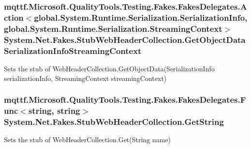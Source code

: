 \hypertarget{class_system_1_1_net_1_1_fakes_1_1_stub_web_header_collection_a063f0856dea1792cac0049c6c4a3ed7d}{
\subsubsection[{Get\-Object\-Data\-Serialization\-Info\-Streaming\-Context}]{\setlength{\rightskip}{0pt plus 5cm}mqttf.\-Microsoft.\-Quality\-Tools.\-Testing.\-Fakes.\-Fakes\-Delegates.\-Action$<$global.\-System.\-Runtime.\-Serialization.\-Serialization\-Info, global.\-System.\-Runtime.\-Serialization.\-Streaming\-Context$>$ System.\-Net.\-Fakes.\-Stub\-Web\-Header\-Collection.\-Get\-Object\-Data\-Serialization\-Info\-Streaming\-Context}}\label{class_system_1_1_net_1_1_fakes_1_1_stub_web_header_collection_a063f0856dea1792cac0049c6c4a3ed7d}


Sets the stub of Web\-Header\-Collection.\-Get\-Object\-Data(\-Serialization\-Info serialization\-Info, Streaming\-Context streaming\-Context)

\hypertarget{class_system_1_1_net_1_1_fakes_1_1_stub_web_header_collection_a1855fcee383d402b4edeea024a1482f8}{
\subsubsection[{Get\-String}]{\setlength{\rightskip}{0pt plus 5cm}mqttf.\-Microsoft.\-Quality\-Tools.\-Testing.\-Fakes.\-Fakes\-Delegates.\-Func$<$string, string$>$ System.\-Net.\-Fakes.\-Stub\-Web\-Header\-Collection.\-Get\-String}}\label{class_system_1_1_net_1_1_fakes_1_1_stub_web_header_collection_a1855fcee383d402b4edeea024a1482f8}


Sets the stub of Web\-Header\-Collection.\-Get(\-String name)

